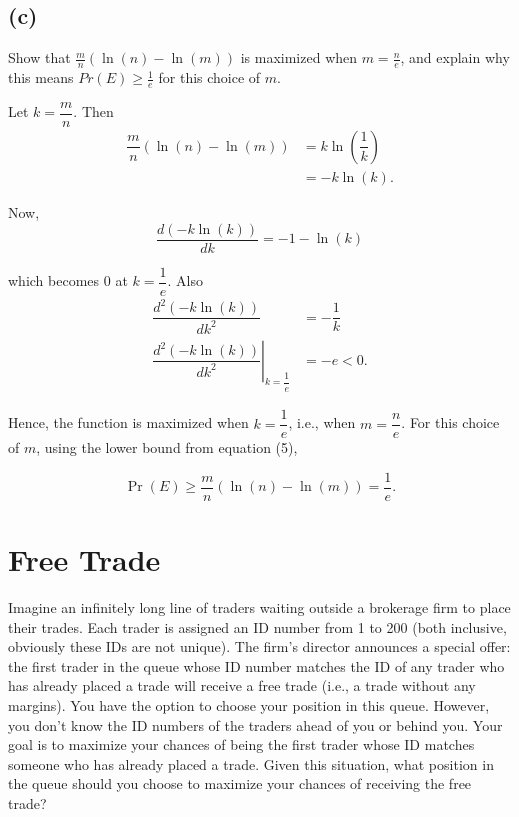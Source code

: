 \documentclass{article}
\begin{document}
\subsection*{(c)}

\begin{tcolorbox}
    Show that $\frac{m}{n}(\ln(n) - \ln(m))$ is maximized when $m = \frac{n}{e}$, and explain why this means $Pr(E) \ge \frac{1}{e}$ for this choice of $m$.
\end{tcolorbox}

Let $k=\dfrac{m}{n}$. Then
\begin{equation}
    \begin{aligned}
    \dfrac{m}{n}(\ln(n)-\ln(m)) &= k\ln(\dfrac{1}{k}) \\
    &= -k\ln(k).
    \end{aligned}
\end{equation}

Now,
\begin{equation}
     \dfrac{d(-k\ln(k))}{dk} = -1-\ln(k)
\end{equation}

which becomes $0$ at $k=\dfrac{1}{e}$. Also 
\begin{equation}
    \begin{aligned}
    \dfrac{d^2(-k\ln(k))}{dk^2} &= -\dfrac{1}{k} \\
    \left.\dfrac{d^2(-k\ln(k))}{dk^2}\right|_{k=\dfrac{1}{e}} &= -e < 0.
    \end{aligned}
\end{equation}

Hence, the function is maximized when $k=\dfrac{1}{e}$, i.e., when $m = \dfrac{n}{e}$. For this choice of $m$, using the lower bound from equation (5),

\begin{equation}
    \Pr(E) \ge \dfrac{m}{n}(\ln(n)-\ln(m)) = \dfrac{1}{e}.
\end{equation}


\setcounter{equation}{0}

\section{Free Trade}

\begin{tcolorbox}
    Imagine an infinitely long line of traders waiting outside a brokerage firm to place their trades.
    Each trader is assigned an ID number from 1 to 200 (both inclusive, obviously these IDs are not
    unique). The firm’s director announces a special offer: the first trader in the queue whose ID
    number matches the ID of any trader who has already placed a trade will receive a free trade (i.e.,
    a trade without any margins). You have the option to choose your position in this queue. However,
    you don’t know the ID numbers of the traders ahead of you or behind you. Your goal is to maximize
    your chances of being the first trader whose ID matches someone who has already placed a trade.
    Given this situation, what position in the queue should you choose to maximize your chances of
    receiving the free trade?
\end{tcolorbox}
\end{document}

